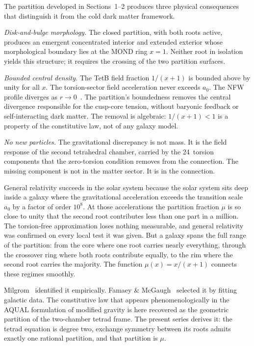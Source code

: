 \documentclass[twocolumn]{iopjournal}
\begin{document}
The partition developed in Sections~1--2 produces three
physical consequences that distinguish it from the cold
dark matter framework.

\textit{Disk-and-bulge morphology.}  The closed partition, with
both roots active, produces an emergent concentrated interior
and extended exterior whose morphological boundary lies at the
MOND ring $x = 1$.  Neither root in isolation yields this
structure; it requires the crossing of the two partition
surfaces.

\textit{Bounded central density.}  The TetB field fraction
$1/(x{+}1)$ is bounded above by unity for all $x$.  The
torsion-sector field acceleration never exceeds $a_0$.  The NFW
profile diverges as $r \to 0$~\cite{NFW1996}.  The partition's
boundedness removes the central divergence responsible for the
cusp-core tension, without baryonic
feedback or self-interacting dark matter.  The removal is
algebraic: $1/(x{+}1) < 1$ is a property of the constitutive
law, not of any galaxy model.

\textit{No new particles.}  The gravitational discrepancy is
not mass.  It is the field response of the second tetrahedral
chamber, carried by the 24~torsion components that the
zero-torsion condition removes from the connection.  The
missing component is not in the matter sector.  It is in the
connection.

General relativity succeeds in the solar system because the
solar system sits deep inside a galaxy where the gravitational
acceleration exceeds the transition scale $a_0$ by a factor of
order $10^8$.  At those accelerations the partition fraction
$\mu$ is so close to unity that the second root contributes
less than one part in a million.  The torsion-free
approximation loses nothing measurable, and general relativity
was confirmed on every local test it was given.  But a galaxy
spans the full range of the partition: from the core where one
root carries nearly everything, through the crossover ring
where both roots contribute equally, to the rim where the
second root carries the majority.  The function
$\mu(x) = x/(x{+}1)$ connects these regimes smoothly.

Milgrom~\cite{Milgrom1983} identified it empirically.  Famaey
\& McGaugh~\cite{FamaeyMcGaugh2012} selected it by fitting
galactic data.  The constitutive law that appears
phenomenologically in the AQUAL formulation of modified
gravity is here recovered as the geometric partition of the
two-chamber tetrad frame.  The present series derives it: the
tetrad equation is degree two, exchange symmetry between its
roots admits exactly one rational partition, and that
partition is $\mu$.
\end{document}
